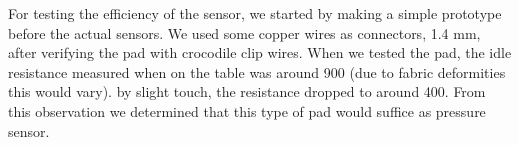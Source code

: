 \documentclass{sigchi-ext}
\begin{document}
For testing
the efficiency of the sensor, we started by making a
simple prototype before the actual sensors.
We used some copper wires as connectors, 1.4 mm, after verifying the pad with
crocodile clip wires. When we tested the pad, the idle resistance measured when on the table was
around 900 (due to fabric deformities this would vary). by slight touch, the resistance dropped to around 400. From this observation we determined that 
this type of pad would suffice as pressure sensor.

\end{document}
